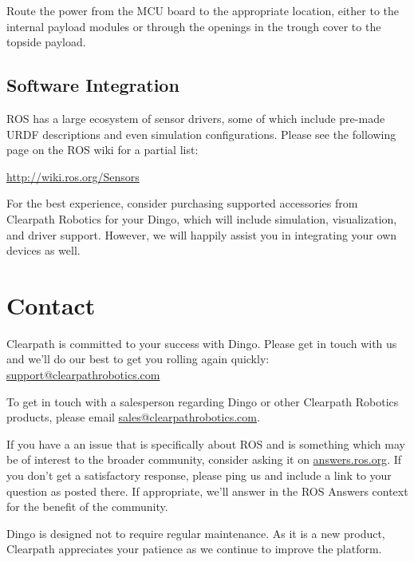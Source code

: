 \documentclass[]{clearpath-latex/clearpath-manual}
\begin{document}
Route the power from the MCU board to the appropriate location, either to the internal payload modules or through the openings in the trough cover to the topside payload.

\subsection{Software Integration}

ROS has a large ecosystem of sensor drivers, some of which include pre-made URDF descriptions and
even simulation configurations. Please see the following page on the ROS wiki for a partial list:

\url{http://wiki.ros.org/Sensors}

For the best experience, consider purchasing supported accessories from Clearpath Robotics for your
Dingo, which will include simulation, visualization, and driver support. However, we will happily
assist you in integrating your own devices as well.


\section{Contact}\label{trouble}\label{contact}

Clearpath is committed to your success with Dingo. Please get in touch with us and we'll
do our best to get you rolling again quickly: \href{mailto:support@clearpathrobotics.com}{support@clearpathrobotics.com}

To get in touch with a salesperson regarding Dingo or other Clearpath Robotics products, please
email \href{mailto:sales@clearpathrobotics.com}{sales@clearpathrobotics.com}.

If you have a an issue that is specifically about ROS and is something which may be of interest
to the broader community, consider asking it on \href{http://answers.ros.org}{answers.ros.org}.
If you don't get a satisfactory response, please ping us and include a link to your question
as posted there. If appropriate, we'll answer in the ROS Answers context for the benefit of the
community.

Dingo is designed not to require regular maintenance. As it is a new product, Clearpath
appreciates your patience as we continue to improve the platform.
\end{document}
